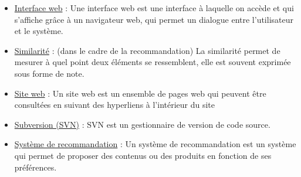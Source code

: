 \documentclass[a4paper,12pt]{report}
\begin{document}
\begin{itemize}
    \item \underline{Interface web} : Une interface web est une interface  à laquelle on accède et qui s'affiche grâce à un navigateur web, qui permet un dialogue entre l'utilisateur et le système.
    
    \item \underline{Similarité} : (dans le cadre de la recommandation) La similarité permet de mesurer à quel point deux éléments se ressemblent, elle est souvent exprimée sous forme de note.
    
    \item \underline{Site web} : Un site web est un ensemble de pages web qui peuvent être consultées en suivant des hyperliens à l'intérieur du site

    \item \underline{Subversion (SVN)} : SVN est un gestionnaire de version de code source.

    \item \underline{Système de recommandation} : Un système de recommandation est un système qui permet de proposer des contenus ou des produits en fonction de ses préférences.
    
\end{itemize}
\end{document}
